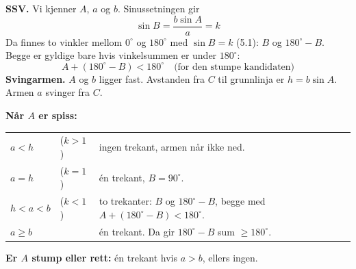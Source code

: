 \begin{mustkunne}
\begin{minipage}[t]{0.52\linewidth}
\textbf{SSV.} Vi kjenner $A$, $a$ og $b$. Sinussetningen gir
\[ \sin B = \frac{b \sin A}{a} = k \]
Da finnes to vinkler mellom $0^\circ$ og $180^\circ$ med $\sin B = k$ (5.1): $B$ og $180^\circ - B$. Begge er gyldige bare hvis vinkelsummen er under $180^\circ$:
\[ A + (180^\circ - B) < 180^\circ \quad\text{(for den stumpe kandidaten)} \]
\textbf{Svingarmen.} $A$ og $b$ ligger fast. Avstanden fra $C$ til grunnlinja er $h = b \sin A$. Armen $a$ svinger fra $C$.
\end{minipage}\hfill
\begin{minipage}[t]{0.44\linewidth}
\centering
{}
\end{minipage}\par\medskip
\renewcommand{\arraystretch}{1.4}
\textbf{Når $A$ er spiss:}\par\smallskip
\begin{tabular}{@{}l l l@{}}
$a < h$ & ($k > 1$) & ingen trekant, armen når ikke ned.\\
$a = h$ & ($k = 1$) & én trekant, $B = 90^\circ$.\\
$h < a < b$ & ($k < 1$) & to trekanter: $B$ og $180^\circ - B$, begge med $A + (180^\circ - B) < 180^\circ$.\\
$a \ge b$ & & én trekant. Da gir $180^\circ - B$ sum $\ge 180^\circ$.\\
\end{tabular}\par\smallskip
\textbf{Er $A$ stump eller rett:} én trekant hvis $a > b$, ellers ingen.
\end{mustkunne}

